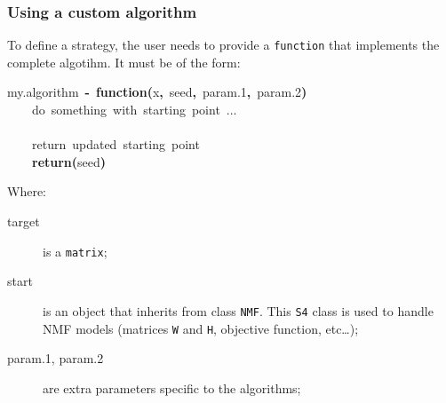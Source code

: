 \documentclass[a4paper]{article}\usepackage{graphicx, color}
\makeatletter
\newcommand{\hlfunctioncall}[1]{\textcolor[rgb]{0.501960784313725,0,0.329411764705882}{\textbf{#1}}}%
\newcommand{\hlkeyword}[1]{\textcolor[rgb]{0,0,0}{\textbf{#1}}}%
\newcommand{\hlcomment}[1]{\textcolor[rgb]{0.180392156862745,0.6,0.341176470588235}{#1}}%
\newcommand{\hlformalargs}[1]{\textcolor[rgb]{0.690196078431373,0.250980392156863,0.0196078431372549}{#1}}%
\newcommand{\hlassignement}[1]{\textcolor[rgb]{0,0,0}{\textbf{#1}}}%
\newcommand{\hlsymbol}[1]{\textcolor[rgb]{0,0,0}{#1}}%
\newcommand{\hlstd}[1]{\textcolor[rgb]{0,0,0}{#1}}%
\newenvironment{kframe}{%
 \def\FrameCommand##1{\hskip\@totalleftmargin \hskip-\fboxsep
 \colorbox{shadecolor}{##1}\hskip-\fboxsep
     \hskip-\linewidth \hskip-\@totalleftmargin \hskip\columnwidth}%
 \MakeFramed {\advance\hsize-\width
   \@totalleftmargin\z@ \linewidth\hsize
   \@setminipage}}%
 {\par\unskip\endMakeFramed}
\newenvironment{knitrout}{}{} %
\let\code=\texttt
\makeatother
\begin{document}
\subsubsection{Using a custom algorithm}\label{sec:algo_custom}
To define a strategy, the user needs to provide a \code{function} that implements the complete algotihm. It must be of the form: 

\begin{knitrout}
\color{fgcolor}\begin{kframe}
\begin{flushleft}
\ttfamily\noindent
\hlsymbol{my.algorithm}{\ }\hlassignement{\usebox{\hlnormalsizeboxlessthan}-}{\ }\hlkeyword{function}\hlkeyword{(}\hlformalargs{x}\hlkeyword{,}{\ }\hlformalargs{seed}\hlkeyword{,}{\ }\hlformalargs{param.1}\hlkeyword{,}{\ }\hlformalargs{param.2}\hlkeyword{)}{\ }\hlkeyword{\usebox{\hlnormalsizeboxopenbrace}}\hspace*{\fill}\\
\hlstd{}{\ }{\ }{\ }{\ }\hlcomment{\usebox{\hlnormalsizeboxhash}{\ }do{\ }something{\ }with{\ }starting{\ }point{\ }...}\hspace*{\fill}\\
\hlstd{}\hspace*{\fill}\\
\hlstd{}{\ }{\ }{\ }{\ }\hlcomment{\usebox{\hlnormalsizeboxhash}{\ }return{\ }updated{\ }starting{\ }point}\hspace*{\fill}\\
\hlstd{}{\ }{\ }{\ }{\ }\hlfunctioncall{return}\hlkeyword{(}\hlsymbol{seed}\hlkeyword{)}\hspace*{\fill}\\
\hlstd{}\hlkeyword{\usebox{\hlnormalsizeboxclosebrace}}\mbox{}
\normalfont
\end{flushleft}
\end{kframe}
\end{knitrout}

Where:

\begin{description}
\item[target] is a \code{matrix}; 
\item[start] is an object that inherits from class \code{NMF}. 
This \code{S4} class is used to handle NMF models (matrices \code{W} and \code{H}, objective function, etc\dots);
\item[param.1, param.2] are extra parameters specific to the algorithms;
\end{description}
\end{document}
